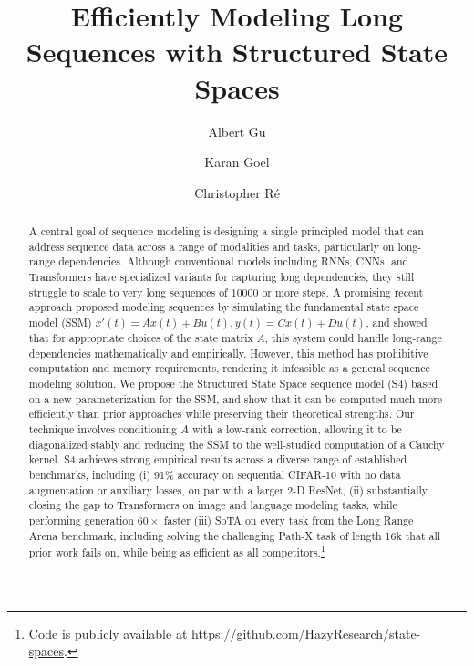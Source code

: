 \documentclass{article} %
\title{Efficiently Modeling Long Sequences with Structured State Spaces}
\author[]{Albert Gu}
\author[]{Karan Goel}
\author[]{Christopher R{\'e}}
\affil[]{Department of Computer Science, Stanford University}
\affil[]{{\texttt{\{albertgu,krng\}@stanford.edu}, \texttt{chrismre@cs.stanford.edu}}}
\date{}
\newcommand{\methodabbrv}{S4}
\begin{document}
\maketitle

\begin{abstract}
  A central goal of sequence modeling is designing a single principled model that can address sequence data across a range of modalities and tasks, particularly on long-range dependencies.
  Although conventional models including RNNs, CNNs, and Transformers have specialized variants for capturing long dependencies, they still struggle to scale to very long sequences of $10000$ or more steps.
  A promising recent approach proposed modeling sequences by simulating the fundamental state space model (SSM) \( x'(t) = Ax(t) + Bu(t), y(t) = Cx(t) + Du(t) \), and showed that for appropriate choices of the state matrix \( A \), this system could handle long-range dependencies mathematically and empirically.
  However, this method has prohibitive computation and memory requirements, rendering it infeasible as a general sequence modeling solution.
  We propose the Structured State Space sequence model (\methodabbrv{}) based on a new parameterization for the SSM, and show that it can be computed much more efficiently than prior approaches while preserving their theoretical strengths.
  Our technique involves conditioning \( A \) with a low-rank correction, allowing it to be diagonalized stably and reducing the SSM to the well-studied computation of a Cauchy kernel.
  \methodabbrv{} achieves strong empirical results across a diverse range of established benchmarks, including (i) 91\% accuracy on sequential CIFAR-10 with no data augmentation or auxiliary losses, on par with a larger 2-D ResNet, (ii) substantially closing the gap to Transformers on image and language modeling tasks, while performing generation $60\times$ faster (iii) SoTA on every task from the Long Range Arena benchmark, including solving the challenging Path-X task of length 16k that all prior work fails on, while being as efficient as all competitors.\footnote{Code is publicly available at \url{https://github.com/HazyResearch/state-spaces}.}
\end{abstract}











\end{document}
